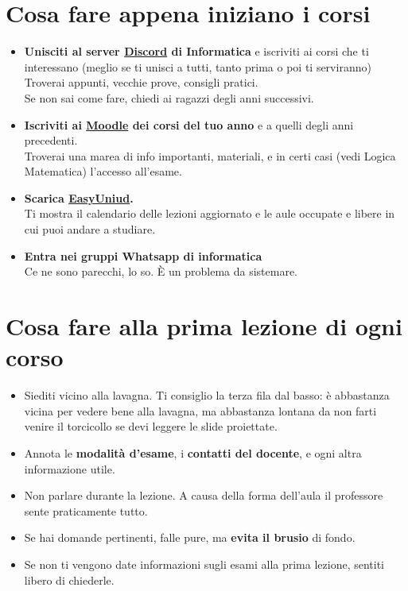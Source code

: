\documentclass[18pt]{extarticle}
\begin{document}
\section{Cosa fare appena iniziano i corsi}
\begin{itemize}
\item \textbf{Unisciti al server \href{https://discord.com/invite/pHHv6TE8WW}{Discord} di Informatica} e iscriviti ai corsi che ti interessano (meglio se ti unisci a tutti, tanto prima o poi ti serviranno)\\
  Troverai appunti, vecchie prove, consigli pratici.\\
  Se non sai come fare, chiedi ai ragazzi degli anni successivi.
\item \textbf{Iscriviti ai \href{https://elearning.uniud.it/moodle/login/index.php}{Moodle} dei corsi del tuo anno} e a quelli degli anni precedenti.\\
  Troverai una marea di info importanti, materiali, e in certi casi (vedi Logica Matematica) l'accesso all'esame.
\item \textbf{Scarica \href{https://play.google.com/store/apps/details?id=it.easystaff.uniud&hl=it}{EasyUniud}.}\\
  Ti mostra il calendario delle lezioni aggiornato e le aule occupate e libere in cui puoi andare a studiare.
\item \textbf{Entra nei gruppi Whatsapp di informatica}\\
Ce ne sono parecchi, lo so. È un problema da sistemare. 
\end{itemize}


\section{Cosa fare alla prima lezione di ogni corso}
\begin{itemize}
\item Siediti vicino alla lavagna. Ti consiglio la terza fila dal basso: è abbastanza vicina per vedere bene alla lavagna, ma abbastanza lontana da non farti venire il torcicollo se devi leggere le slide proiettate.
\item Annota le \textbf{modalità d'esame}, i \textbf{contatti del docente}, e ogni altra informazione utile.
\item Non parlare durante la lezione. A causa della forma dell'aula il professore sente praticamente tutto.
\item Se hai domande pertinenti, falle pure, ma \textbf{evita il brusio} di fondo.
\item Se non ti vengono date informazioni sugli esami alla prima lezione, sentiti libero di chiederle.
\end{itemize}
\end{document}
